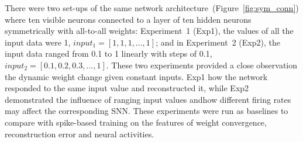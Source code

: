 \DIFaddend There were two set-ups of the same network architecture~(Figure~\ref{fig:sym_conn}) where ten visible neurons connected to a layer of ten hidden neurons symmetrically with all-to-all weights: \DIFdelbegin {}\DIFdelend \DIFaddbegin {}\DIFaddend Experiment~1 (Exp1), the values of all the input data were 1, $input_1 = [1, 1, 1,...,1]$; and in Experiment~2 (Exp2), the input data ranged from 0.1 to 1 linearly with steps of 0.1, $input_2 = [0.1, 0.2, 0.3,...,1]$.
These two experiments provided a close observation \DIFdelbegin {}\DIFdelend \DIFaddbegin {}\DIFaddend the dynamic weight change given constant inputs.
Exp1 \DIFdelbegin {}\DIFdelend \DIFaddbegin {}\DIFaddend how the network responded to the same input value and reconstructed it, while Exp2 demonstrated the influence of ranging input values and\DIFdelbegin {}\DIFdelend \DIFaddbegin {}\DIFaddend how different firing rates may affect the corresponding SNN.
These experiments were run as baselines to compare with spike-based training on the features of weight convergence, reconstruction error and neural activities.


